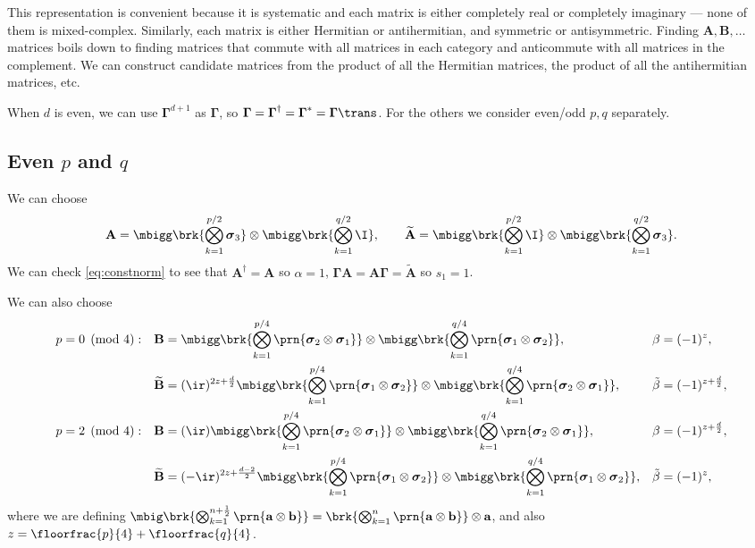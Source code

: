 \documentclass[11pt]{article}
\newcommand{\Gammab}{\boldsymbol{\Gamma}}
\newcommand{\A}{\mathbf{A}}
\newcommand{\B}{\mathbf{B}}
\newcommand{\At}{\widetilde{\A}}
\newcommand{\Bt}{\widetilde{\B}}
\newcommand{\sigmab}{\boldsymbol{\sigma}}
\newcommand{\betat}{\tilde{\beta}}
\begin{document}
This representation is convenient because it is systematic and each matrix is either completely real or completely imaginary --- none of them is mixed-complex.
Similarly, each matrix is either Hermitian or antihermitian, and symmetric or antisymmetric.
Finding $\A, \B, \dots$ matrices boils down to finding matrices that commute with all matrices in each category and anticommute with all matrices in the complement.
We can construct candidate matrices from the product of all the Hermitian matrices, the product of all the antihermitian matrices, etc.

When $d$ is even, we can use $\Gammab^{d+1}$ as $\Gammab$, so $\Gammab = \Gammab^\dag = \Gammab^\ast =\Gammab\trans$.
For the others we consider even/odd $p,q$ separately.


\subsection{Even \texorpdfstring{$p$ and $q$}{p and q}}\label{sec:eveneven}

We can choose
%
\begin{equation*}
  \A = \mbigg\brk{\bigotimes_{k=1}^{p/2} \sigmab_3}
        \otimes \mbigg\brk{\bigotimes_{k=1}^{q/2} \I},
  \qquad
  \At = \mbigg\brk{\bigotimes_{k=1}^{p/2} \I}
        \otimes \mbigg\brk{\bigotimes_{k=1}^{q/2} \sigmab_3}.
\end{equation*}
%
We can check \cref{eq:constnorm} to see that $\A^\dag = \A$ so $\alpha=1$, $\Gammab \A = \A \Gammab = \At$ so $s_1 = 1$.

We can also choose
%
\begin{equation*}
\begin{aligned}
  p &= 0 \pmod 4: &
  \B &= \mbigg\brk{\bigotimes_{k=1}^{p/4} \prn{\sigmab_2 \otimes \sigmab_1}} \otimes
        \mbigg\brk{\bigotimes_{k=1}^{q/4} \prn{\sigmab_1 \otimes \sigmab_2}}, &
  \beta &= (-1)^{z}, \\ &&
  \Bt &= (\ir)^{2z + \frac{d}{2}}
        \mbigg\brk{\bigotimes_{k=1}^{p/4} \prn{\sigmab_1 \otimes \sigmab_2}} \otimes
        \mbigg\brk{\bigotimes_{k=1}^{q/4} \prn{\sigmab_2 \otimes \sigmab_1}}, &
  \betat &= (-1)^{z+\frac{d}{2}}, \\
  p &= 2 \pmod 4: &
  \B &= (\ir)
        \mbigg\brk{\bigotimes_{k=1}^{p/4} \prn{\sigmab_2 \otimes \sigmab_1}} \otimes
        \mbigg\brk{\bigotimes_{k=1}^{q/4} \prn{\sigmab_2 \otimes \sigmab_1}}, &
  \beta &= (-1)^{z + \frac{d}{2}}, \\ &&
  \Bt &= (-\ir)^{2z + \frac{d-2}{2}}
        \mbigg\brk{\bigotimes_{k=1}^{p/4} \prn{\sigmab_1 \otimes \sigmab_2}} \otimes
        \mbigg\brk{\bigotimes_{k=1}^{q/4} \prn{\sigmab_1 \otimes \sigmab_2}}, &
  \betat &= (-1)^{z}, 
      \end{aligned}
\end{equation*}
%
where we are defining \( \mbig\brk{\bigotimes_{k=1}^{n+\frac{1}{2}} \prn{\mathbf{a} \otimes \mathbf{b}}}
= \brk{\bigotimes_{k=1}^{n} \prn{\mathbf{a} \otimes \mathbf{b}}} \otimes \mathbf{a} \),
and also $z = \floorfrac{p}{4} + \floorfrac{q}{4}$.
\end{document}
